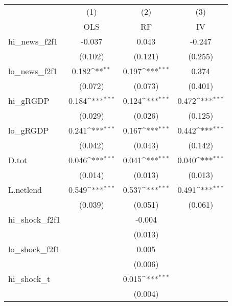 {
\def\sym#1{\ifmmode^{#1}\else\(^{#1}\)\fi}
\begin{tabular}{l*{3}{c}}
\toprule
            &\multicolumn{1}{c}{(1)}&\multicolumn{1}{c}{(2)}&\multicolumn{1}{c}{(3)}\\
            &\multicolumn{1}{c}{OLS}&\multicolumn{1}{c}{RF}&\multicolumn{1}{c}{IV}\\
\midrule
hi\_news\_f2f1&      -0.037         &       0.043         &      -0.247         \\
            &     (0.102)         &     (0.121)         &     (0.255)         \\
\addlinespace
lo\_news\_f2f1&       0.182\sym{**} &       0.197\sym{***}&       0.374         \\
            &     (0.072)         &     (0.073)         &     (0.401)         \\
\addlinespace
hi\_gRGDP    &       0.184\sym{***}&       0.124\sym{***}&       0.472\sym{***}\\
            &     (0.029)         &     (0.026)         &     (0.125)         \\
\addlinespace
lo\_gRGDP    &       0.241\sym{***}&       0.167\sym{***}&       0.442\sym{***}\\
            &     (0.042)         &     (0.043)         &     (0.142)         \\
\addlinespace
D.tot       &       0.046\sym{***}&       0.041\sym{***}&       0.040\sym{***}\\
            &     (0.014)         &     (0.013)         &     (0.013)         \\
\addlinespace
L.netlend   &       0.549\sym{***}&       0.537\sym{***}&       0.491\sym{***}\\
            &     (0.039)         &     (0.051)         &     (0.061)         \\
\addlinespace
hi\_shock\_f2f1&                     &      -0.004         &                     \\
            &                     &     (0.013)         &                     \\
\addlinespace
lo\_shock\_f2f1&                     &       0.005         &                     \\
            &                     &     (0.006)         &                     \\
\addlinespace
hi\_shock\_t  &                     &       0.015\sym{***}&                     \\
            &                     &     (0.004)         &                     \\

\end{tabular}}
